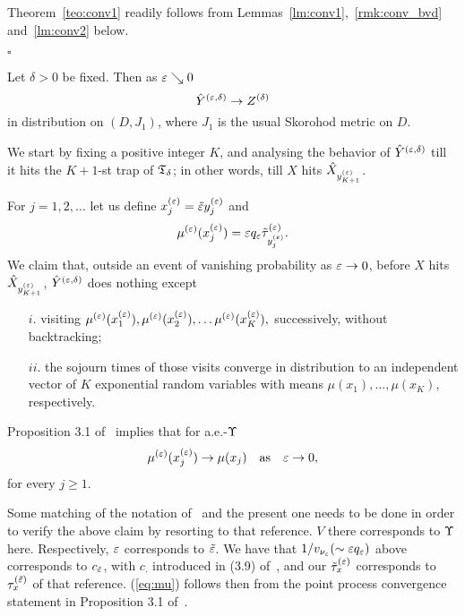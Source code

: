 Theorem~\ref{teo:conv1} readily follows from Lemmas~\ref{lm:conv1},~\ref{rmk:conv_bvd} 
and~\ref{lm:conv2} below.


$\square$


\begin{lm}
\label{lm:conv1}
Let $\delta>0$ be fixed.
Then as $\varepsilon\searrow0$
\begin{equation}
\label{eq:conve1}
\byed\to\bzd
\end{equation}
in distribution on $(D,J_1)$, where $J_1$ is the usual Skorohod metric on $D$.
\end{lm}







We start by fixing a positive integer $K$, and analysing the behavior of $\hat Y^{(\varepsilon,\delta)}$ till it hits the $K+1$-st trap of
${\mathfrak T}_{\delta}$; in other words, till $X$ hits $\hat X_{y^{(\varepsilon)}_{K+1}}$. 

For $j=1,2,\ldots$ let us define $x^{(\varepsilon)}_j=\tilde{\varepsilon}y^{(\varepsilon)}_j$ and 
\begin{equation}
\label{eq:mue}
\mue(\xe_j)=\eps q_\eps\tilde\tau^{(\eps)}_{\yep_j}.
\end{equation}
We claim that, outside an event of vanishing probability as $\varepsilon\to0$, 
before $X$ hits $\hat X_{y^{(\varepsilon)}_{K+1}}$, $\hat Y^{(\varepsilon,\delta)}$ does nothing except 
\begin{itemize}
 \item[$i$.] visiting 
$\mu^{(\varepsilon)}(x^{(\varepsilon)}_1),\mu^{(\varepsilon)}(x^{(\varepsilon)}_2),\ldots\mu^{(\varepsilon)}(x^{(\varepsilon)}_K),$ 
successively, without backtracking;

 \item[$ii$.]  the sojourn times of those visits converge in distribution to an independent vector of $K$ 
exponential random variables with means $\mu(x_1),\ldots,\mu(x_K)$, respectively.
\end{itemize}



Proposition 3.1 of~\cite{kn:FIN} implies that for a.e.-$\Upsilon$
\begin{equation}
\label{eq:mu}
\mue(\xe_j)\to\mu(x_j)\quad\mbox{as}\quad\eps\to0,
\end{equation}
for every $j\geq1$.
\begin{rmk}
 \label{rmk:fin}
Some matching of the notation of~\cite{kn:FIN} and the present one needs to be 
done in order to verify the above claim by resorting to that reference.
$V$ there corresponds to $\Upsilon$ here. Respectively, $\varepsilon$ corresponds to $\tilde{\varepsilon}$.
We have that $1/v_{\nu_\varepsilon}(\sim\varepsilon q_\varepsilon)$ above corresponds to $c_{\tilde{\varepsilon}}$, 
with $c_\cdot$ introduced in (3.9) of~\cite{kn:FIN}, 
and our $\tilde\tau_x^{(\varepsilon)}$ corresponds to $\tau_{x}^{(\tilde{\varepsilon})}$ of that 
reference. (\ref{eq:mu}) follows then from the point process convergence
statement in Proposition 3.1 of~\cite{kn:FIN}.
\end{rmk}


